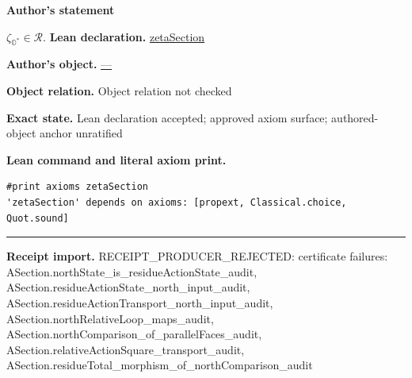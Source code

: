 \documentclass[11pt]{article}
\newcommand{\OO}{\mathbb{O}}
\newcommand{\Ostar}{\OO^{*}}
\newcommand{\zetaO}{\zeta_{\Ostar}}
\theoremstyle{plain}
\theoremstyle{definition}
\theoremstyle{remark}
\begin{document}
\medskip
\begin{tcolorbox}[provenancecard,title={30. Theorem - \$\textbackslash{}zetaO\$ is a section of \$\textbackslash{}mathcal R\$},title after break={30. Theorem - \$\textbackslash{}zetaO\$ is a section of \$\textbackslash{}mathcal R\$ (continued)}]
\textbf{Author's statement}\par
$\zetaO\in\mathcal R$.
\tcblower
\textbf{Lean declaration.} \url{zetaSection}
\par\textbf{Author's object.} \url{—}
\par\textbf{Object relation.} Object relation not checked
\par\textbf{Exact state.} Lean declaration accepted; approved axiom surface; authored-object anchor unratified
\par\smallskip\textbf{Lean command and literal axiom print.}
\begin{Verbatim}[breaklines=true,breakanywhere=true,fontsize=\small]
#print axioms zetaSection
'zetaSection' depends on axioms: [propext, Classical.choice, Quot.sound]
\end{Verbatim}
\medskip\hrule\medskip
\textbf{Receipt import.} \textcolor{KgtRed}{RECEIPT\_PRODUCER\_REJECTED: certificate failures: ASection.northState\_is\_residueActionState\_audit, ASection.residueActionState\_north\_input\_audit, ASection.residueActionTransport\_north\_input\_audit, ASection.northRelativeLoop\_maps\_audit, ASection.northComparison\_of\_parallelFaces\_audit, ASection.relativeActionSquare\_transport\_audit, ASection.residueTotal\_morphism\_of\_northComparison\_audit}
\end{tcolorbox}
\medskip
\end{document}
